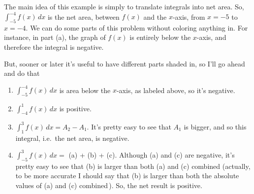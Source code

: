 \documentclass[oneside]{book}
\newcommand{\dx}{\,dx}
\newcommand{\xtickmark}[2][]
{\ifx#1\relax\relax
  \draw [pin distance = 5pt,inner sep = 0pt,outer sep = 0pt, pin edge
  = thick](#2,0) 
     node[pin={[inner sep = 5pt]below:$#2$}]{}
  \else 
  \draw [pin distance = 5pt,inner sep =0pt, outer sep = 0pt, pin edge
  = thick](#2,0) 
     node[pin={[inner sep = 5pt]below:$#1$}]{}
  \fi}
\newcommand{\ytickmark}[2][]
{\ifx#1\relax\relax
  \draw[pin distance = 5pt,inner sep = 0pt, outer sep = 0pt, pin edge
  = thick](0,#2) 
     node[pin={[inner sep = 2pt]left:$#2$}]{}
  \else
  \draw[pin distance = 5pt,inner sep = 0pt, outer sep = 0pt, pin edge
  = thick](0,#2) 
     node[pin={[inner sep = 2pt]left:$#1$}]{}
  \fi}
\theoremstyle{definition}
\theoremstyle{solution}
\newtheorem*{solution}{Solution}
\newenvironment{solution}{\vspace{2in}\comment}{\endcomment}
\begin{document}
\begin{solution}
  The main idea of this example is simply to translate integrals into
  net area.  So, $\int_{-5}^{-4} f(x)\dx$ is the net area, between
  $f(x)$ and the $x$-axis, from $x=-5$ to $x=-4$.  We can do some
  parts of this problem without coloring anything in.  For instance,
  in part (a), the graph of $f(x)$ is entirely below the $x$-axis, and
  therefore the integral is negative.

  But, sooner or later it's useful to have different parts shaded in,
  so I'll go ahead and do that
\begin{center}
\end{center}

\begin{enumerate}
\item $\int_{-5}^{-4}f(x)\dx$ is area below the $x$-axis, as labeled
  above, so it's negative.

\item  $\int_{-4}^1 f(x)\dx$ is positive.

\item $\int_1^3 f(x)\dx = A_2 - A_1$.  It's pretty easy to see that
  $A_1$ is bigger, and so this integral, i.e.\ the net area, is
  negative.

\item $\int_{-5}^3 f(x)\dx = $ (a) + (b) + (c).  Although (a) and (c)
  are negative, it's pretty easy to see that (b) is larger than both
  (a) and (c) combined (actually, to be more accurate I should say
  that (b) is larger than both the absolute values of (a) and (c)
  combined\,).  So, the net result is positive.
\end{enumerate}
\end{solution}
\end{document}
